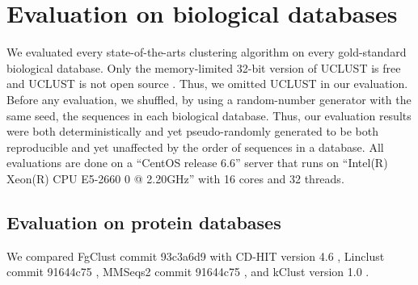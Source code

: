 \documentclass[11pt,letterpaper]{article}
\begin{document}
\section{Evaluation on biological databases}

We evaluated every state-of-the-arts clustering algorithm on every gold-standard biological database.
Only the memory-limited 32-bit version of UCLUST is free and UCLUST is not open source \citep{edgar2010search}.
Thus, we omitted UCLUST in our evaluation.
Before any evaluation, we shuffled, by using a random-number generator with the same seed, the sequences in each biological database.
Thus, our evaluation results were both deterministically and yet pseudo-randomly generated to be both reproducible and yet unaffected by the order of sequences in a database.
All evaluations are done on a ``CentOS release 6.6'' server that runs on ``Intel(R) Xeon(R) CPU E5-2660 0 @ 2.20GHz'' with 16 cores and 32 threads.

\subsection{Evaluation on protein databases}

We compared FgClust commit 93c3a6d9 with CD-HIT version 4.6 \citep{fu2012cd}, Linclust commit 91644c75 \citep{steinegger2017linclust}, MMSeqs2 commit 91644c75 \citep{steinegger2017mmseqs2}, and kClust version 1.0 \citep{hauser2013kclust}. 
\end{document}
